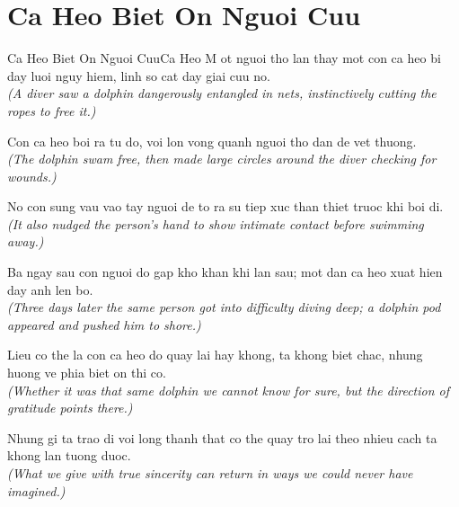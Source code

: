 \section{Ca Heo Biet On Nguoi Cuu}
\begin{truyen}{Ca Heo Biet On Nguoi Cuu}{Ca Heo}
M ot nguoi tho lan thay mot con ca heo bi day luoi nguy hiem, linh so cat day giai cuu no.\\
\textit{(A diver saw a dolphin dangerously entangled in nets, instinctively cutting the ropes to free it.)}

Con ca heo boi ra tu do, voi lon vong quanh nguoi tho dan de vet thuong.\\
\textit{(The dolphin swam free, then made large circles around the diver checking for wounds.)}

No con sung vau vao tay nguoi de to ra su tiep xuc than thiet truoc khi boi di.\\
\textit{(It also nudged the person's hand to show intimate contact before swimming away.)}

Ba ngay sau con nguoi do gap kho khan khi lan sau; mot dan ca heo xuat hien day anh len bo.\\
\textit{(Three days later the same person got into difficulty diving deep; a dolphin pod appeared and pushed him to shore.)}

Lieu co the la con ca heo do quay lai hay khong, ta khong biet chac, nhung huong ve phia biet on thi co.\\
\textit{(Whether it was that same dolphin we cannot know for sure, but the direction of gratitude points there.)}

\end{truyen}
\begin{baihoc}
  Nhung gi ta trao di voi long thanh that co the quay tro lai theo nhieu cach ta khong lan tuong duoc.\\
  \textit{(What we give with true sincerity can return in ways we could never have imagined.)}
\end{baihoc}

